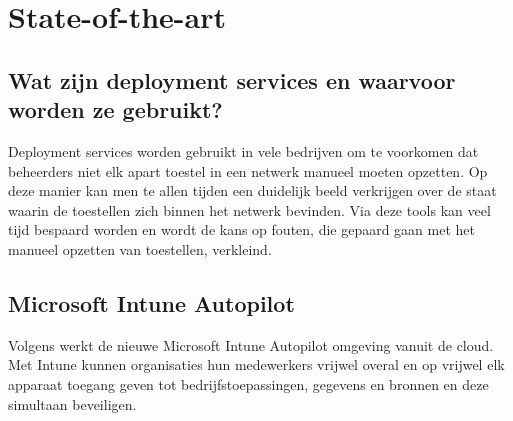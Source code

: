 \section{State-of-the-art}
\label{sec:state-of-the-art}



\subsection{Wat zijn deployment services en waarvoor worden ze gebruikt?}
Deployment services worden gebruikt in vele bedrijven om te voorkomen dat beheerders niet elk apart toestel in een netwerk manueel moeten opzetten. Op deze manier kan men te allen tijden een duidelijk beeld verkrijgen over de staat waarin de toestellen zich binnen het netwerk bevinden. Via deze tools kan veel tijd bespaard worden en wordt de kans op fouten, die gepaard gaan met het manueel opzetten van toestellen, verkleind. \autocite{Goessens2020}

\subsection{Microsoft Intune Autopilot}
Volgens \textcite{PCI2021} werkt de nieuwe Microsoft Intune Autopilot omgeving vanuit de cloud. Met Intune kunnen organisaties hun medewerkers vrijwel overal en op vrijwel elk apparaat toegang geven tot bedrijfstoepassingen, gegevens en bronnen en deze simultaan beveiligen.

